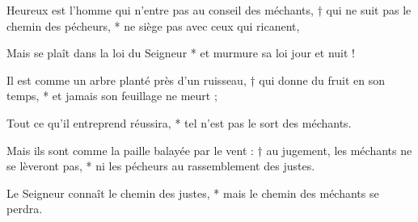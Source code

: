 \item Heureux est l'homme qui n'entre pas au conseil des méchants, † qui ne suit pas le chemin des pécheurs, * ne siège pas avec ceux qui ricanent,
\item Mais se plaît dans la loi du Seigneur * et murmure sa loi jour et nuit !
\item Il est comme un arbre planté près d'un ruisseau, † qui donne du fruit en son temps, * et jamais son feuillage ne meurt ;
\item Tout ce qu'il entreprend réussira, * tel n'est pas le sort des méchants.
\item Mais ils sont comme la paille balayée par le vent : † au jugement, les méchants ne se lèveront pas, * ni les pécheurs au rassemblement des justes.
\item Le Seigneur connaît le chemin des justes, * mais le chemin des méchants se perdra.